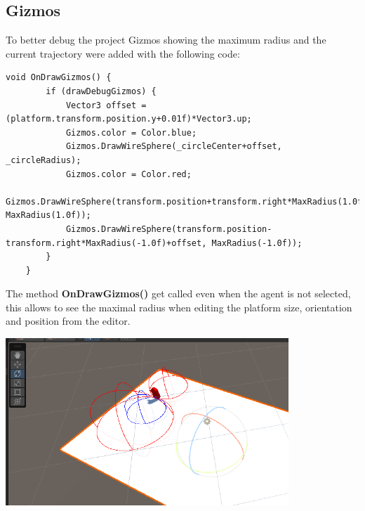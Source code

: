 \documentclass[12pt, a4paper]{article}
\begin{document}
\subsection{Gizmos}
To better debug the project Gizmos showing the maximum radius and the current trajectory were added with the following code:
\begin{lstlisting}[caption={Gizmos drawing}]
    void OnDrawGizmos() {
        if (drawDebugGizmos) {
            Vector3 offset = (platform.transform.position.y+0.01f)*Vector3.up;
            Gizmos.color = Color.blue;
            Gizmos.DrawWireSphere(_circleCenter+offset, _circleRadius);
            Gizmos.color = Color.red;
            Gizmos.DrawWireSphere(transform.position+transform.right*MaxRadius(1.0f)+offset, MaxRadius(1.0f));
            Gizmos.DrawWireSphere(transform.position-transform.right*MaxRadius(-1.0f)+offset, MaxRadius(-1.0f));
        }
    }
\end{lstlisting}
The method \textbf{OnDrawGizmos()} get called even when the agent is not selected, this allows to see the maximal radius when editing the platform size, orientation and position from the editor.
\begin{center}
    \centering
    \includegraphics[width=0.8\textwidth]{gizmos.png}
\end{center}
\end{document}
